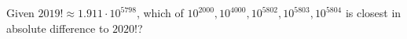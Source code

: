 Given $2019!\approx1.911\cdot10^{5798}$, which of $10^{2000},10^{4000},10^{5802},10^{5803},10^{5804}$ is closest in absolute difference to $2020!$?
